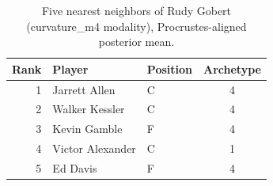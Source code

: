 \begin{table}[htbp]
  \centering\small
  \begin{tabular}{rllc}
    \toprule
    Rank & Player & Position & Archetype \\
    \midrule
    1 & Jarrett Allen & C & 4 \\
    2 & Walker Kessler & C & 4 \\
    3 & Kevin Gamble & F & 4 \\
    4 & Victor Alexander & C & 1 \\
    5 & Ed Davis & F & 4 \\
    \bottomrule
  \end{tabular}
  \caption{Five nearest neighbors of Rudy Gobert (curvature_m4 modality), Procrustes-aligned posterior mean.}
  \label{tab:Rudy_Gobert_neighbors_curvature_m4}
\end{table}


